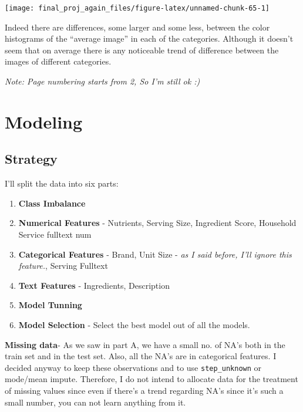 \documentclass[
]{article}
\providecommand{\tightlist}{%
  \setlength{\itemsep}{0pt}\setlength{\parskip}{0pt}}
\begin{document}
\begin{center}\texttt{[image: final\_proj\_again\_files/figure-latex/unnamed-chunk-65-1]} \end{center}

Indeed there are differences, some larger and some less, between the
color histograms of the ``average image'' in each of the categories.
Although it doesn't seem that on average there is any noticeable trend
of difference between the images of different categories.

\emph{Note: Page numbering starts from 2, So I'm still ok :)} \newpage

\hypertarget{modeling}{%
\section{Modeling}\label{modeling}}

\hypertarget{strategy}{%
\subsection{Strategy}\label{strategy}}

I'll split the data into six parts:

\begin{enumerate}
\def\labelenumi{\arabic{enumi}.}
\tightlist
\item
  \textbf{Class Imbalance}
\item
  \textbf{Numerical Features} - Nutrients, Serving Size, Ingredient
  Score, Household Service fulltext num
\item
  \textbf{Categorical Features} - Brand, Unit Size - \emph{as I said
  before, I'll ignore this feature.}, Serving Fulltext
\item
  \textbf{Text Features} - Ingredients, Description
\item
  \textbf{Model Tunning}
\item
  \textbf{Model Selection} - Select the best model out of all the
  models.
\end{enumerate}

\textbf{Missing data}- As we saw in part A, we have a small no. of NA's
both in the train set and in the test set. Also, all the NA's are in
categorical features. I decided anyway to keep these observations and to
use \texttt{step\_unknown} or mode/mean impute. Therefore, I do not
intend to allocate data for the treatment of missing values since even
if there's a trend regarding NA's since it's such a small number, you
can not learn anything from it.
\end{document}
